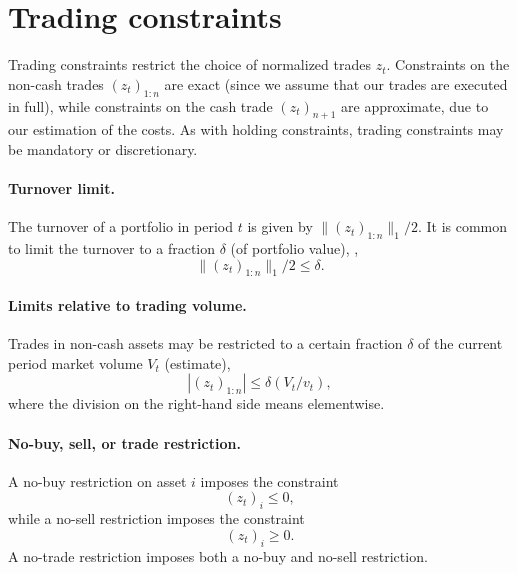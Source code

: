 \documentclass[openany]{now}
\begin{document}
\section{Trading constraints}
\label{s-trading-constr}

Trading constraints restrict the choice of normalized trades $z_t$.
Constraints on the non-cash trades $(z_t)_{1:n}$
are exact (since we assume that our trades are executed in full),
while constraints on the cash trade $(z_t)_{n+1}$ are approximate,
due to our estimation of the costs.
As with holding constraints, trading constraints may be mandatory
or discretionary.

\paragraph{Turnover limit.}
The turnover of a portfolio in period $t$ is given by $\|(z_t)_{1:n}\|_1/2$.
It is common to limit the turnover to a fraction $\delta$ (of portfolio value),
\ie,
\[
\|(z_t)_{1:n}\|_1/2 \leq \delta.
\]

\paragraph{Limits relative to trading volume.}
Trades in non-cash assets may be restricted to a certain fraction
$\delta$ of the current period market volume $V_t$ (estimate),
\[
|(z_t)_{1:n}| \leq \delta (V_t/v_t),
\]
where the division on the right-hand side means elementwise.

\paragraph{No-buy, sell, or trade restriction.}
A no-buy restriction on asset $i$ imposes the constraint
\[
(z_t)_i \leq 0,
\]
while a no-sell restriction imposes the constraint
\[
(z_t)_i \geq 0.
\]
A no-trade restriction imposes both a no-buy and no-sell restriction.
\end{document}
